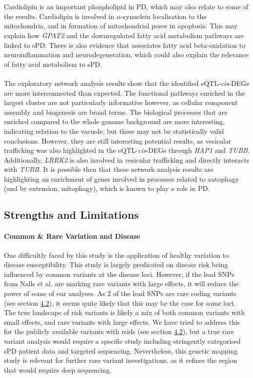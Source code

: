 \documentclass{article}
\begin{document}
\\
\\Cardiolipin is an important phospholipid in PD, which may also relate to some of the results. Cardiolipin is involved in $\alpha$-synuclein localisation to the mitochondria\cite{Ghio2016InteractionCardiolipin}, and in formation of mitochondrial pores in apoptosis\cite{Vringer2023MitochondriaInflammation}. This may explain how \textit{GPAT2} and the downregulated fatty acid metabolism pathways are linked to sPD. There is also evidence that associates fatty acid beta-oxidation to neuroinflammation and neurodegeneration\cite{Bogie2020FattyDisorders}, which could also explain the relevance of fatty acid metabolism to sPD.
\\
\\
The exploratory network analysis results show that the identified eQTL-\textit{cis}-DEGs are more interconnected than expected. The functional pathways enriched in the largest cluster are not particularly informative however, as cellular component assembly and biogenesis are broad terms. The biological processes that are enriched compared to the whole genome background are more interesting, indicating relation to the vacuole, but these may not be statistically valid conclusions. However, they are still interesting potential results, as vesicular trafficking was also highlighted in the eQTL-\textit{cis}-DEGs through \textit{HAP1} and \textit{TUBB}. Additionally, \textit{LRRK2} is also involved in vesicular trafficking\cite{Usmani2021TheDisease} and directly interacts with \textit{TUBB}\cite{Law2014AAcetylation}. It is possible then that these network analysis results are highlighting an enrichment of genes involved in processes related to autophagy (and by extension, mitophagy), which is known to play a role in PD\cite{Lizama2021NeuronalDisease}.
\subsection{Strengths and Limitations}
\paragraph{Common \& Rare Variation and Disease}
One difficultly faced by this study is the application of healthy variation to disease susceptibility. This study is largely predicated on disease risk being influenced by common variants at the disease loci. However, if the lead SNPs from Nalls et al.\cite{Nalls2019IdentificationStudies} are marking rare variants with large effects, it will reduce the power of some of our analyses. As 2 of the lead SNPs are rare coding variants (see section \hyperref[subsec:codingvariants]{4.2}), it seems quite likely that this may be the case for some loci. The true landscape of risk variants is likely a mix of both common variants with small effects, and rare variants with large effects. We have tried to address this for the publicly available variants with rsids (see section \hyperref[subsec:codingvariants]{4.2}), but a true rare variant analysis would require a specific study including stringently categorised sPD patient data and targeted sequencing. Nevertheless, this genetic mapping study is relevant for further rare variant investigations, as it refines the region that would require deep sequencing.
\end{document}
